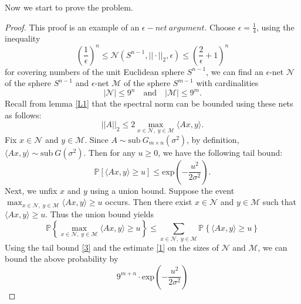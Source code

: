 \documentclass[11pt]{article}
\begin{document}
\noindent Now we start to prove the problem.

\begin{proof}
This proof is an example of an $\epsilon-net\ argument$. Choose $\epsilon=\frac{1}{4}$, using the inequality 
\[
\left(\frac{1}{\epsilon}\right)^n \leq \mathcal{N}(S^{n-1},||\cdot||_2,\epsilon) \leq \left(\frac{2}{\epsilon}+1\right)^n
\]
for covering numbers of the unit Euclidean sphere $S^{n-1}$, we can find an $\epsilon$-net $\mathcal{N}$ of the sphere $S^{n-1}$ and $\epsilon$-net $\mathcal{M}$ of the sphere $S^{m-1}$ with cardinalities
\begin{equation}
    \label{1}
    |\mathcal{N}| \leq 9^n \quad \text{and} \quad |\mathcal{M}| \leq 9^m.
\end{equation}
Recall from lemma \ref{L1} that the spectral norm can be bounded using these nets as follows:
\begin{equation}
    \label{2}
    ||A||_2 \leq 2 \max\limits_{x\in\mathcal{N},\; y\in\mathcal{M}} \langle Ax,y \rangle.
\end{equation}
Fix $x\in\mathcal{N}$ and $y\in\mathcal{M}$. Since $A\sim \text{sub}\ G_{m\times n}(\sigma^2)$, by definition, $\langle Ax,y \rangle \sim \text{sub}\ G(\sigma^2)$. Then for any $u\geq0$, we have the following tail bound:
\begin{equation}
    \label{3}
    \mathbb{P}[\langle Ax,y \rangle \geq u] \leq \text{exp}(-\frac{u^2}{2\sigma^2}).
\end{equation}
Next, we unfix $x$ and $y$ using a union bound. Suppose the event $\max_{x\in\mathcal{N},\; y\in\mathcal{M}} \langle Ax,y \rangle \geq u$ occurs. Then there exist $x\in\mathcal{N}$ and $y\in\mathcal{M}$ such that $\langle Ax,y \rangle \geq u$. Thus the union bound yields
\[
\mathbb{P}\left\{\max\limits_{x\in\mathcal{N},\; y\in\mathcal{M}} \langle Ax,y \rangle \geq u\right\} \leq \sum\limits_{x\in\mathcal{N},\; y\in\mathcal{M}}\mathbb{P}\left\{\langle Ax,y \rangle \geq u\right\}
\]
Using the tail bound \eqref{3} and the estimate \eqref{1} on the sizes of $\mathcal{N}$ and $\mathcal{M}$, we can bound the above probability by 
\begin{equation}
    \label{4}
    9^{m+n} \cdot \text{exp}(-\frac{u^2}{2\sigma^2})
\end{equation}

\end{proof}
\end{document}
